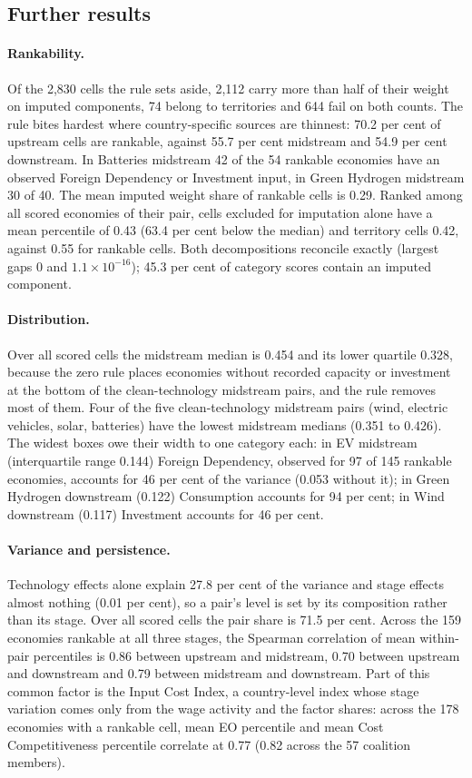 \subsection{Further results}

\paragraph{Rankability.} Of the 2{,}830 cells the rule sets aside, 2{,}112 carry more than half of
their weight on imputed components, 74 belong to territories and 644 fail on both counts. The rule
bites hardest where country-specific sources are thinnest: 70.2 per cent of upstream cells are
rankable, against 55.7 per cent midstream and 54.9 per cent downstream. In Batteries midstream 42
of the 54 rankable economies have an observed Foreign Dependency or Investment input, in Green
Hydrogen midstream 30 of 40. The mean imputed weight share of rankable cells is 0.29. Ranked among
all scored economies of their pair, cells excluded for imputation alone have a mean percentile of
0.43 (63.4 per cent below the median) and territory cells 0.42, against 0.55 for rankable cells.
Both decompositions reconcile exactly (largest gaps 0 and $1.1\times10^{-16}$); 45.3 per cent of
category scores contain an imputed component.

\paragraph{Distribution.} Over all scored cells the midstream median is 0.454 and its lower
quartile 0.328, because the zero rule places economies without recorded capacity or investment at
the bottom of the clean-technology midstream pairs, and the rule removes most of them. Four of the
five clean-technology midstream pairs (wind, electric vehicles, solar, batteries) have the lowest
midstream medians (0.351 to 0.426). The widest boxes owe their width to one category each: in EV
midstream (interquartile range 0.144) Foreign Dependency, observed for 97 of 145 rankable
economies, accounts for 46 per cent of the variance (0.053 without it); in Green Hydrogen
downstream (0.122) Consumption accounts for 94 per cent; in Wind downstream (0.117) Investment
accounts for 46 per cent.

\paragraph{Variance and persistence.} Technology effects alone explain 27.8 per cent of the
variance and stage effects almost nothing (0.01 per cent), so a pair's level is set by its
composition rather than its stage. Over all scored cells the pair share is 71.5 per cent. Across
the 159 economies rankable at all three stages, the Spearman correlation of mean within-pair
percentiles is 0.86 between upstream and midstream, 0.70 between upstream and downstream and 0.79
between midstream and downstream. Part of this common factor is the Input Cost Index, a
country-level index whose stage variation comes only from the wage activity and the factor shares:
across the 178 economies with a rankable cell, mean EO percentile and mean Cost Competitiveness
percentile correlate at 0.77 (0.82 across the 57 coalition members).

